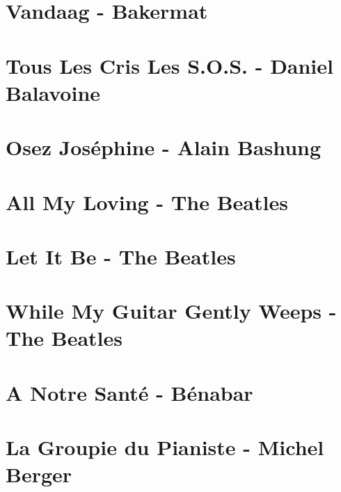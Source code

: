\documentclass[11pt]{article}
\begin{document}
\section{Vandaag - Bakermat}
\begin{guitar}

\end{guitar}


\section{Tous Les Cris Les S.O.S. - Daniel Balavoine}
\begin{guitar}

\end{guitar}

\section{Osez Joséphine - Alain Bashung}
\begin{guitar}

\end{guitar}



\section{All My Loving - The Beatles}


\section{Let It Be - The Beatles}
\begin{guitar}

\end{guitar}

\section{While My Guitar Gently Weeps - The Beatles}




\section{A Notre Santé - Bénabar}



\section{La Groupie du Pianiste - Michel Berger}

\end{document}
